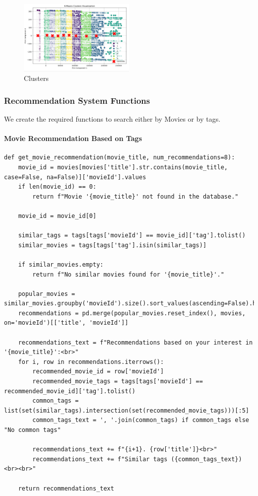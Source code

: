 \documentclass[conference]{IEEEtran}
\begin{document}
\begin{figure}[h] %
    \centering %
    \includegraphics[width=0.5\textwidth]{Clusters.png} %
    \caption{Clusters}
    \label{fig: Clusters of K}
\end{figure}

\subsubsection{Recommendation System Functions}

We create the required functions to search either by Movies or by tags.

\paragraph{Movie Recommendation Based on Tags}
\begin{lstlisting}
def get_movie_recommendation(movie_title, num_recommendations=8):
    movie_id = movies[movies['title'].str.contains(movie_title, case=False, na=False)]['movieId'].values
    if len(movie_id) == 0:
        return f"Movie '{movie_title}' not found in the database."
    
    movie_id = movie_id[0]
    
    similar_tags = tags[tags['movieId'] == movie_id]['tag'].tolist()
    similar_movies = tags[tags['tag'].isin(similar_tags)]
    
    if similar_movies.empty:
        return f"No similar movies found for '{movie_title}'."
    
    popular_movies = similar_movies.groupby('movieId').size().sort_values(ascending=False).head(num_recommendations)
    recommendations = pd.merge(popular_movies.reset_index(), movies, on='movieId')[['title', 'movieId']]
    
    recommendations_text = f"Recommendations based on your interest in '{movie_title}':<br>"
    for i, row in recommendations.iterrows():
        recommended_movie_id = row['movieId']
        recommended_movie_tags = tags[tags['movieId'] == recommended_movie_id]['tag'].tolist()
        common_tags = list(set(similar_tags).intersection(set(recommended_movie_tags)))[:5]
        common_tags_text = ', '.join(common_tags) if common_tags else "No common tags"
        
        recommendations_text += f"{i+1}. {row['title']}<br>"
        recommendations_text += f"Similar tags ({common_tags_text})<br><br>"
    
    return recommendations_text
\end{lstlisting}
\end{document}
